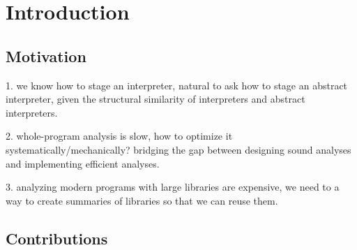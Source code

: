 \section{Introduction}

\subsection{Motivation}

1. we know how to stage an interpreter, natural to ask how to stage an abstract interpreter, given 
the structural similarity of interpreters and abstract interpreters.

2. whole-program analysis is slow, how to optimize it systematically/mechanically?
bridging the gap between designing sound analyses and implementing efficient analyses.

3. analyzing modern programs with large libraries are expensive, we need to a way to create
summaries of libraries so that we can reuse them.

\subsection{Contributions}
